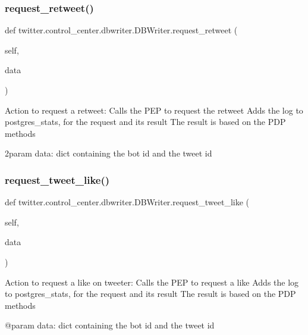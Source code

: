 \subsubsection{\texorpdfstring{request\+\_\+retweet()}{request\_retweet()}}
{\footnotesize\ttfamily def twitter.\+control\+\_\+center.\+dbwriter.\+D\+B\+Writer.\+request\+\_\+retweet (\begin{DoxyParamCaption}\item[{}]{self,  }\item[{}]{data }\end{DoxyParamCaption})}

\begin{DoxyVerb}Action to request a retweet:
Calls the PEP to request the retweet
Adds the log to postgres_stats, for the request and its result
The result is based on the PDP methods

2param data: dict containing the bot id and the tweet id
\end{DoxyVerb}
 \mbox{\label{classtwitter_1_1control__center_1_1dbwriter_1_1DBWriter_acb9c768e2862639056ef226e2eab77ec}} 
\subsubsection{\texorpdfstring{request\+\_\+tweet\+\_\+like()}{request\_tweet\_like()}}
{\footnotesize\ttfamily def twitter.\+control\+\_\+center.\+dbwriter.\+D\+B\+Writer.\+request\+\_\+tweet\+\_\+like (\begin{DoxyParamCaption}\item[{}]{self,  }\item[{}]{data }\end{DoxyParamCaption})}

\begin{DoxyVerb}Action to request a like on tweeter:
Calls the PEP to request a like
Adds the log to postgres_stats, for the request and its result
The result is based on the PDP methods

@param data: dict containing the bot id and the tweet id
\end{DoxyVerb}
 \mbox{\label{classtwitter_1_1control__center_1_1dbwriter_1_1DBWriter_a876d7b694fb3f54940e7f07afcbb0c09}} 
